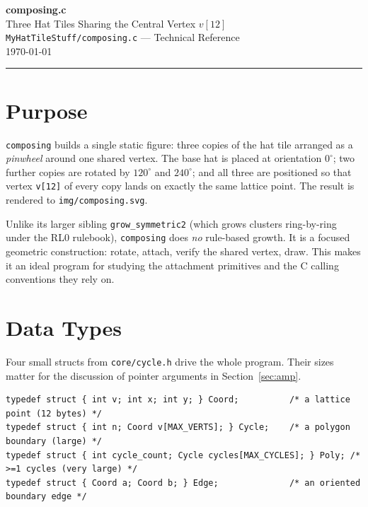 \documentclass[10pt,a4paper]{article}
\let\polysection\section
\renewcommand\section{\needspace{0.16\textheight}\polysection}
\newcommand{\code}[1]{\texttt{\small #1}}
\newcommand{\file}[1]{\texttt{\footnotesize #1}}
\begin{document}
\begin{center}
  {\Huge\bfseries\color{titlecolor} composing.c}\\[4pt]
  {\large\color{headercolor} Three Hat Tiles Sharing the Central Vertex $v[12]$}\\[6pt]
  {\small \file{MyHatTileStuff/composing.c} — Technical Reference}\\[2pt]
  {\small\color{gray} \today}
\end{center}

\vspace{6pt}
\noindent\rule{\linewidth}{1pt}
\vspace{4pt}

\section{Purpose}

\code{composing} builds a single static figure: three copies of the hat tile
arranged as a \emph{pinwheel} around one shared vertex.  The base hat is
placed at orientation $0^\circ$; two further copies are rotated by $120^\circ$
and $240^\circ$; and all three are positioned so that vertex \code{v[12]} of
every copy lands on exactly the same lattice point.  The result is rendered to
\file{img/composing.svg}.

\medskip
\noindent Unlike its larger sibling \code{grow\_symmetric2} (which grows
clusters ring-by-ring under the RL0 rulebook), \code{composing} does
\emph{no} rule-based growth.  It is a focused geometric construction:
rotate, attach, verify the shared vertex, draw.  This makes it an ideal
program for studying the attachment primitives and the C calling
conventions they rely on.

\section{Data Types}

Four small structs from \file{core/cycle.h} drive the whole program.  Their
sizes matter for the discussion of pointer arguments in
Section~\ref{sec:amp}.

\begin{verbatim}
typedef struct { int v; int x; int y; } Coord;          /* a lattice point (12 bytes) */
typedef struct { int n; Coord v[MAX_VERTS]; } Cycle;    /* a polygon boundary (large) */
typedef struct { int cycle_count; Cycle cycles[MAX_CYCLES]; } Poly; /* >=1 cycles (very large) */
typedef struct { Coord a; Coord b; } Edge;              /* an oriented boundary edge */
\end{verbatim}
\end{document}
